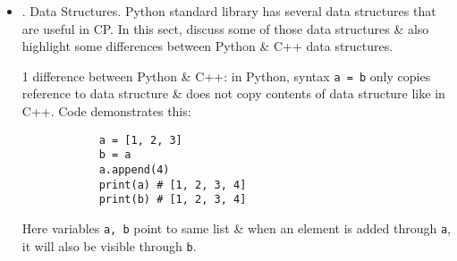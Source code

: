 \documentclass{article}
\begin{document}
\begin{itemize}
\begin{itemize}
\begin{itemize}
\begin{itemize}
				\item Function {\tt combinations} generates all subsequences of input sequence that have $k$ elements. E.g., when input sequence is $[1,2,3]$ \& $k = 2$, combinations are $(1,2),(1,3),(2,3)$. Each subsequence corresponds to a subset of size $k$.
				\item Function {\tt product} generates all sequences of length $k$ where each element comes from input sequence. E.g., when input sequence if $[1,2,3]$ \& $k = 2$, sequences are $(1,1),(1,2),(1,3),(2,1),(2,2),(2,3),(3,1),(3,2),(3,3)$.
				\item Function \verb|combinations_with_replacements| generates all sequences of length $k$ where each element comes from input sequence \& order of elements is same as input sequence. E.g., when input sequence is $[1,2,3]$ \& $k = 2$, combinations are $(1,1),(1,2),(1,3),(2,2),(2,3),(3,3)$.
			\end{itemize}
			Code demonstrates how to use functions:
			\begin{verbatim}
				import itertools
				s = [1, 2, 3]
				k = 2
				print(list(itertools.permutations(s)))
				print(list(itertools.combinations(s, k)))
				print(list(itertools.product(s, repeat=k)))
				print(list(itertools.combinations_with_replacement(s, k)))
			\end{verbatim}
			Output of code:
			\begin{verbatim}
				[(1, 2, 3), (1, 3, 2), (2, 1, 3), (2, 3, 1), (3, 1, 2),
				(3, 2, 1)]
				[(1, 2), (1, 3), (2, 3)]
				[(1, 1), (1, 2), (1, 3), (2, 1), (2, 2), (2, 3), (3, 1),
				(3, 2), (3, 3)]
				[(1, 1), (1, 2), (1, 3), (2, 2), (2, 3), (3, 3)]
			\end{verbatim}
		\end{itemize}
		\item {. Data Structures.} Python standard library has several data structures that are useful in CP. In this sect, discuss some of those data structures \& also highlight some differences between Python \& C++ data structures.
		
		1 difference between Python \& C++: in Python, syntax {\tt a = b} only copies reference to data structure \& does not copy contents of data structure like in C++. Code demonstrates this:
		\begin{verbatim}
			a = [1, 2, 3]
			b = a
			a.append(4)
			print(a) # [1, 2, 3, 4]
			print(b) # [1, 2, 3, 4]
		\end{verbatim}
		Here variables {\tt a, b} point to same list \& when an element is added through {\tt a}, it will also be visible through {\tt b}.
		

\end{itemize}
\end{itemize}
\end{document}
